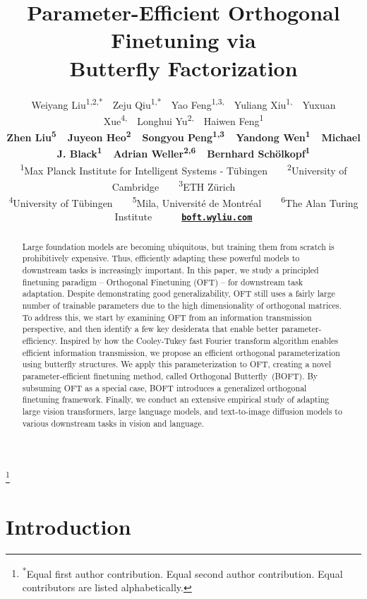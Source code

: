 \documentclass{article} %
\title{\vspace{-5.7mm}\fontsize{15.5pt}{\baselineskip}\selectfont Parameter-Efficient Orthogonal Finetuning via\\Butterfly Factorization\vspace{-1mm}}
\author{\fontsize{8pt}{\baselineskip}\selectfont Weiyang Liu\textsuperscript{1,2,*}~~Zeju Qiu\textsuperscript{1,*}~~Yao Feng\textsuperscript{1,3,\textdagger}~~Yuliang Xiu\textsuperscript{1,\textdagger}~~Yuxuan Xue\textsuperscript{4,\textdagger}~~Longhui Yu\textsuperscript{2,\textdagger}~~Haiwen Feng\textsuperscript{1}\\
\textbf{\fontsize{8pt}{\baselineskip}\selectfont Zhen Liu\textsuperscript{5}~~Juyeon Heo\textsuperscript{2}~~Songyou Peng\textsuperscript{1,3}~~Yandong Wen\textsuperscript{1}~~Michael J. Black\textsuperscript{1}~~Adrian Weller\textsuperscript{2,6}~~Bernhard Schölkopf\textsuperscript{1}}\\[0.35mm]
\fontsize{8.75pt}{\baselineskip}\selectfont\textsuperscript{1}Max Planck Institute for Intelligent Systems - Tübingen~~~~\textsuperscript{2}University of Cambridge~~~~\textsuperscript{3}ETH Zürich~~~~\\
\fontsize{8.75pt}{\baselineskip}\selectfont \textsuperscript{4}University of Tübingen~~~~\textsuperscript{5}Mila, Université de Montréal~~~~\textsuperscript{6}The Alan Turing Institute~~~~~~\href{https://boft.wyliu.com}{\textbf{\texttt{boft.wyliu.com}}}
\vspace{-9mm}
}
\newcommand\blfootnote[1]{%
  \begingroup
  \renewcommand\thefootnote{}\footnote{#1}%
  \addtocounter{footnote}{-1}%
  \endgroup
}
\begin{document}
\doparttoc
\faketableofcontents

\maketitle


\blfootnote{\hspace{-2mm}\textsuperscript{*}Equal first author contribution. \textsuperscript{\textdagger}Equal second author contribution. Equal contributors are listed alphabetically.}

\begin{abstract}
\vspace{-1.6mm}
Large foundation models are becoming ubiquitous, but training them from scratch is prohibitively expensive.
Thus, efficiently adapting these powerful models to downstream tasks is increasingly important. In this paper, we study a principled finetuning paradigm -- Orthogonal Finetuning (OFT) -- for downstream task adaptation. Despite demonstrating good generalizability, OFT still uses a fairly large number of trainable parameters due to the high dimensionality of orthogonal matrices. To address this, we start by examining OFT from an information transmission perspective, and then identify a few key desiderata that enable better parameter-efficiency. Inspired by how the Cooley-Tukey fast Fourier transform algorithm enables efficient information transmission, we propose an efficient orthogonal parameterization using  butterfly structures. We apply this parameterization to OFT, creating  a novel parameter-efficient finetuning method, called Orthogonal Butterfly~(BOFT). By subsuming OFT as a special case, BOFT introduces a generalized orthogonal finetuning framework. Finally, we conduct an extensive empirical study of adapting large vision transformers, large language models, and text-to-image diffusion models to various downstream tasks in vision and language. %
\end{abstract}

\vspace{-3mm}
\section{Introduction}
\vspace{-1.6mm}
\end{document}
